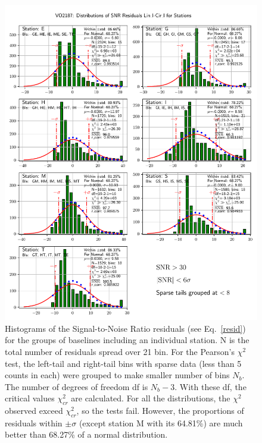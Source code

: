 \documentclass[letterpaper,twoside,12pt]{article}
\begin{document}
\begin{figure}[ht!]
  \begin{center}
  \includegraphics[width=33pc]{VO2187_Distr_SNR_Lin_I-Cir_I_Diff_Stations.pdf}
  \caption{\small Histograms of the Signal-to-Noise Ratio residuals (see Eq.~\eqref{resid}) for the groups of baselines including an individual station. N is the total number of residuals spread over 21 bin. For the Pearson's $\chi^2$ test, the left-tail and right-tail bins with sparse data (less than 5 counts in each) were grouped to make smaller number of bins $N_b$. The number of degrees of freedom df is $N_b-3$. With these df, the critical values $\chi^2_{cr}$ are calculated. For all the distributions, the $\chi^2$ observed exceed $\chi^2_{cr}$, so the tests fail. However, the proportions of residuals within $\pm\sigma$  (except station M with its 64.81\%) are much better than 68.27\% of a normal distribution. }
  \label{dsnr_distr_st}
  \end{center}
\end{figure}
\end{document}
